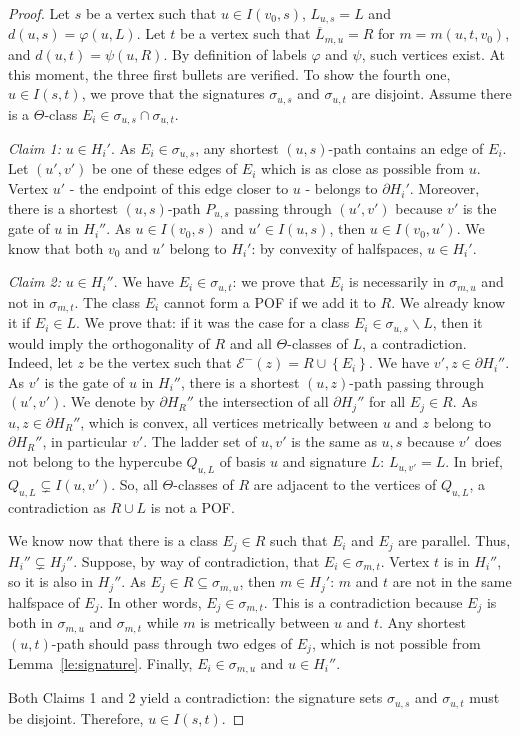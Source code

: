 \documentclass{article}
\newcommand{\set}[1]{\left\{ #1 \right\}}
\begin{document}
\begin{proof}
Let $s$ be a vertex such that $u \in I(v_0,s)$, $L_{u,s} = L$ and $d(u,s) = \varphi(u,L)$. Let $t$ be a vertex such that $\overline{L}_{m,u} = R$ for $m = m(u,t,v_0)$, and $d(u,t) = \psi(u,R)$.
By definition of labels $\varphi$ and $\psi$, such vertices exist.
At this moment, the three first bullets are verified.
To show the fourth one, $u \in I(s,t)$, we prove that the signatures $\sigma_{u,s}$ and $\sigma_{u,t}$ are disjoint. Assume there is a $\Theta$-class $E_i \in \sigma_{u,s} \cap \sigma_{u,t}$.

\textit{Claim 1:} $u \in H_i'$.
As $E_i \in \sigma_{u,s}$, any shortest $(u,s)$-path contains an edge of $E_i$. Let $(u',v')$ be one of these edges of $E_i$ which is as close as possible from $u$. Vertex $u'$ - the endpoint of this edge closer to $u$ - belongs to $\partial H_i'$. Moreover, there is a shortest $(u,s)$-path $P_{u,s}$ passing through $(u',v')$ because $v'$ is the gate of $u$ in $H_i''$. As $u \in I(v_0,s)$ and $u' \in I(u,s)$, then $u \in I(v_0,u')$. We know that both $v_0$ and $u'$ belong to $H_i'$: by convexity of halfspaces, $u \in H_i'$. 

\textit{Claim 2:} $u \in H_i''$. We have $E_i \in \sigma_{u,t}$: we prove that $E_i$ is necessarily in $\sigma_{m,u}$ and not in $\sigma_{m,t}$. The class $E_i$ cannot form a POF if we add it to $R$. We already know it if $E_i \in L$. We prove that: if it was the case for a class $E_i \in \sigma_{u,s} \backslash L$, then it would imply the orthogonality of $R$ and all $\Theta$-classes of $L$, a contradiction. Indeed, let $z$ be the vertex such that $\mathcal{E}^-(z) = R \cup \set{E_i}$. We have $v',z \in \partial H_i''$. As $v'$ is the gate of $u$ in $H_i''$, there is a shortest $(u,z)$-path passing through $(u',v')$. We denote by $\partial H_R''$ the intersection of all $\partial H_j''$ for all $E_j \in R$. As $u,z \in \partial H_R''$, which is convex, all vertices metrically between $u$ and $z$ belong to $\partial H_R''$, in particular $v'$. The ladder set of $u,v'$ is the same as $u,s$ because $v'$ does not belong to the hypercube $Q_{u,L}$ of basis $u$ and signature $L$: $L_{u,v'} = L$. In brief, $Q_{u,L} \subsetneq I(u,v')$. So, all $\Theta$-classes of $R$ are adjacent to the vertices of $Q_{u,L}$, a contradiction as $R \cup L$ is not a POF.
 
We know now that there is a class $E_j \in R$ such that $E_i$ and $E_j$ are parallel. Thus, $H_i'' \subsetneq H_j''$. Suppose, by way of contradiction, that $E_i \in \sigma_{m,t}$. Vertex $t$ is in $H_i''$, so it is also in $H_j''$. As $E_j \in R \subseteq \sigma_{m,u}$, then $m \in H_j'$: $m$ and $t$ are not in the same halfspace of $E_j$. In other words, $E_j \in \sigma_{m,t}$. This is a contradiction because $E_j$ is both in $\sigma_{m,u}$ and $\sigma_{m,t}$ while $m$ is metrically between $u$ and $t$. Any shortest $(u,t)$-path should pass through two edges of $E_j$, which is not possible from Lemma~\ref{le:signature}. Finally, $E_i \in \sigma_{m,u}$ and $u \in H_i''$.

Both Claims 1 and 2 yield a contradiction: the signature sets $\sigma_{u,s}$ and $\sigma_{u,t}$ must be disjoint. Therefore, $u \in I(s,t)$.
\end{proof}
\end{document}
